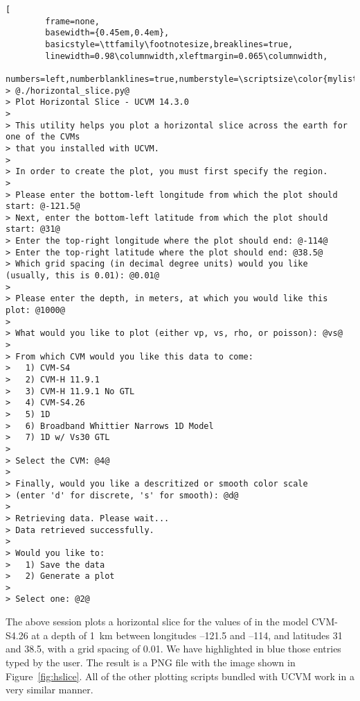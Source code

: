 \begin{lstlisting}[
        frame=none,
        basewidth={0.45em,0.4em},
        basicstyle=\ttfamily\footnotesize,breaklines=true,
        linewidth=0.98\columnwidth,xleftmargin=0.065\columnwidth,
        numbers=left,numberblanklines=true,numberstyle=\scriptsize\color{mylistingnclr},style=input]
> @./horizontal_slice.py@
> Plot Horizontal Slice - UCVM 14.3.0
>
> This utility helps you plot a horizontal slice across the earth for one of the CVMs
> that you installed with UCVM.
>
> In order to create the plot, you must first specify the region.
>
> Please enter the bottom-left longitude from which the plot should start: @-121.5@
> Next, enter the bottom-left latitude from which the plot should start: @31@
> Enter the top-right longitude where the plot should end: @-114@
> Enter the top-right latitude where the plot should end: @38.5@
> Which grid spacing (in decimal degree units) would you like (usually, this is 0.01): @0.01@
>
> Please enter the depth, in meters, at which you would like this plot: @1000@
>
> What would you like to plot (either vp, vs, rho, or poisson): @vs@
>
> From which CVM would you like this data to come:
>	1) CVM-S4
>	2) CVM-H 11.9.1
>	3) CVM-H 11.9.1 No GTL
>	4) CVM-S4.26
>	5) 1D
>	6) Broadband Whittier Narrows 1D Model
>	7) 1D w/ Vs30 GTL
>
> Select the CVM: @4@
>
> Finally, would you like a descritized or smooth color scale
> (enter 'd' for discrete, 's' for smooth): @d@
>
> Retrieving data. Please wait...
> Data retrieved successfully.
>
> Would you like to:
>	1) Save the data
>	2) Generate a plot
>
> Select one: @2@
\end{lstlisting}

The above session plots a horizontal slice for the values of \vs{} in the model CVM-S4.26 at a depth of 1~km between longitudes --121.5\textdegree{} and --114\textdegree{}, and latitudes 31\textdegree{} and 38.5\textdegree{}, with a grid spacing of 0.01\textdegree{}. We have highlighted in blue those entries typed by the user. The result is a PNG file with the image shown in Figure~\ref{fig:hslice}. All of the other plotting scripts bundled with UCVM work in a very similar manner.



